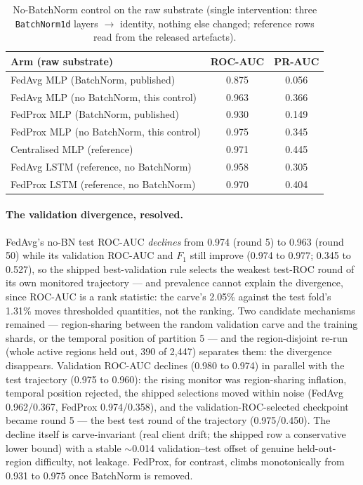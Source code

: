 \begin{table}[t]
\centering
\caption{No-BatchNorm control on the raw substrate (single
intervention: three \texttt{BatchNorm1d} layers $\to$ identity,
nothing else changed; reference rows read from the released
artefacts).}
\label{tab:rawnobn}
\small
\begin{tabular}{@{}l c c@{}}
\toprule
\textbf{Arm (raw substrate)} & \textbf{ROC-AUC} & \textbf{PR-AUC} \\
\midrule
FedAvg MLP (BatchNorm, published) & 0.875 & 0.056 \\
FedAvg MLP (no BatchNorm, this control) & 0.963 & 0.366 \\
FedProx MLP (BatchNorm, published) & 0.930 & 0.149 \\
FedProx MLP (no BatchNorm, this control) & 0.975 & 0.345 \\
\midrule
Centralised MLP (reference) & 0.971 & 0.445 \\
FedAvg LSTM (reference, no BatchNorm) & 0.958 & 0.305 \\
FedProx LSTM (reference, no BatchNorm) & 0.970 & 0.404 \\
\bottomrule
\end{tabular}
\end{table}

\paragraph{The validation divergence, resolved.}
FedAvg's no-BN test ROC-AUC \emph{declines} from 0.974 (round 5) to
0.963 (round 50) while its validation ROC-AUC and $F_1$ still
improve (0.974 to 0.977; 0.345 to 0.527), so the shipped
best-validation rule selects the weakest test-ROC round of its own
monitored trajectory --- and prevalence cannot explain the
divergence, since ROC-AUC is a rank statistic: the carve's 2.05\%
against the test fold's 1.31\% moves thresholded quantities, not
the ranking. Two candidate mechanisms remained --- region-sharing
between the random validation carve and the training shards, or the
temporal position of partition 5 --- and the region-disjoint re-run
(whole active regions held out, 390 of 2{,}447) separates them: the
divergence disappears. Validation ROC-AUC declines (0.980 to
0.974) in parallel with the test trajectory (0.975 to 0.960): the
rising monitor was region-sharing inflation, temporal position
rejected, the shipped selections moved within noise (FedAvg 0.962/0.367,
FedProx 0.974/0.358), and the validation-ROC-selected checkpoint
became round 5 --- the best test round of the trajectory
(0.975/0.450). The decline itself is carve-invariant (real client
drift; the shipped row a conservative lower bound) with a stable
$\sim$0.014 validation--test offset of genuine held-out-region
difficulty, not leakage. FedProx, for contrast, climbs monotonically
from 0.931 to 0.975 once BatchNorm is removed.
